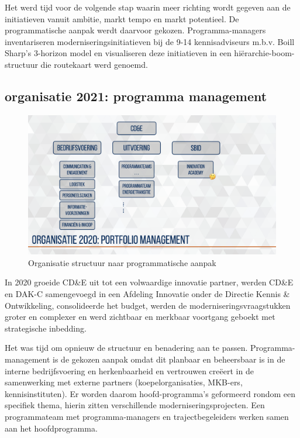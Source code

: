 \documentclass[
]{book}
\begin{document}
Het werd tijd voor de volgende stap waarin meer richting wordt gegeven aan de initiatieven vanuit ambitie, markt tempo en markt potentieel. De programmatische aanpak werdt daarvoor gekozen. Programma-managers inventariseren moderniseringsinitiatieven bij de 9-14 kennisadviseurs m.b.v. Boill Sharp's 3-horizon model en visualiseren deze initiatieven in een hiërarchie-boom-structuur die routekaart werd genoemd.

\hypertarget{organisatie-2021-programma-management}{%
\subsection{organisatie 2021: programma management}\label{organisatie-2021-programma-management}}

\begin{figure}
\includegraphics[width=26.67in]{data/keynote-slides/20200430-CDE-Designprocess/20200430-CDE-Designprocess.009-4} \caption{Organisatie structuur naar programmatische aanpak }\label{fig:unnamed-chunk-9}
\end{figure}

In 2020 groeide CD\&E uit tot een volwaardige innovatie partner, werden CD\&E en DAK-C samengevoegd in een Afdeling Innovatie onder de Directie Kennis \& Ontwikkeling, consolideerde het budget, werden de moderniseringsvraagstukken groter en complexer en werd zichtbaar en merkbaar voortgang geboekt met strategische inbedding.

Het was tijd om opnieuw de structuur en benadering aan te passen. Programma-management is de gekozen aanpak omdat dit planbaar en beheersbaar is in de interne bedrijfsvoering en herkenbaarheid en vertrouwen creëert in de samenwerking met externe partners (koepelorganisaties, MKB-ers, kennisinstituten). Er worden daarom hoofd-programma's geformeerd rondom een specifiek thema, hierin zitten verschillende moderniseringsprojecten. Een programmateam met programma-managers en trajectbegeleiders werken samen aan het hoofdprogramma.
\end{document}
